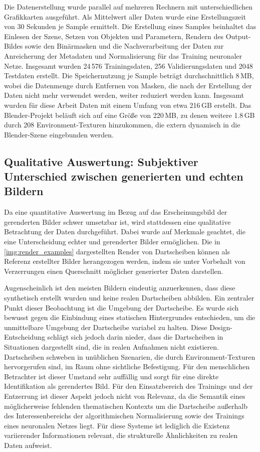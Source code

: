 Die Datenerstellung wurde parallel auf mehreren Rechnern mit unterschiedlichen Grafikkarten ausgeführt. Als Mittelwert aller Daten wurde eine Erstellungszeit von 30 Sekunden je Sample ermittelt. Die Erstellung eines Samples beinhaltet das Einlesen der Szene, Setzen von Objekten und Parametern, Rendern des Output-Bildes sowie den Binärmasken und die Nachverarbeitung der Daten zur Anreicherung der Metadaten und Normalisierung für das Training neuronaler Netze. Insgesamt wurden 24\,576 Trainingsdaten, 256 Validierungsdaten und 2048 Testdaten erstellt. Die Speichernutzung je Sample beträgt durchschnittlich 8\,MB, wobei die Datenmenge durch Entfernen von Masken, die nach der Erstellung der Daten nicht mehr verwendet werden, weiter reduziert werden kann. Insgesamt wurden für diese Arbeit Daten mit einem Umfang von etwa 216\,GB erstellt. Das Blender-Projekt beläuft sich auf eine Größe von 220\,MB, zu denen weitere 1.8\,GB durch 208 Environment-Texturen hinzukommen, die extern dynamisch in die Blender-Szene eingebunden werden.

\subsection{Qualitative Auswertung: Subjektiver Unterschied zwischen generierten und echten Bildern}  %
\label{sec:rendering_qualitativ}

Da eine quantitative Auswertung im Bezug auf das Erscheinungsbild der gerenderten Bilder schwer umsetzbar ist, wird stattdessen eine qualitative Betrachtung der Daten durchgeführt. Dabei wurde auf Merkmale geachtet, die eine Unterscheidung echter und gerenderter Bilder ermöglichen. Die in \autoref{img:render_examples} dargestellten Render von Dartscheiben können als Referenz erstellter Bilder herangezogen werden, indem sie unter Vorbehalt von Verzerrungen einen Querschnitt möglicher generierter Daten darstellen.

Augenscheinlich ist den meisten Bildern eindeutig anzuerkennen, dass diese synthetisch erstellt wurden und keine realen Dartscheiben abbilden. Ein zentraler Punkt dieser Beobachtung ist die Umgebung der Dartscheibe. Es wurde sich bewusst gegen die Einbindung eines statischen Hintergrundes entschieden, um die unmittelbare Umgebung der Dartscheibe variabel zu halten. Diese Design-Entscheidung schlägt sich jedoch darin nieder, dass die Dartscheiben in Situationen dargestellt sind, die in realen Aufnahmen nicht existieren. Dartscheiben schweben in unüblichen Szenarien, die durch Environment-Texturen hervorgerufen sind, im Raum ohne sichtliche Befestigung. Für den menschlichen Betrachter ist dieser Umstand sehr auffällig und sorgt für eine direkte Identifikation als gerendertes Bild. Für den Einsatzbereich des Trainings und der Entzerrung ist dieser Aspekt jedoch nicht von Relevanz, da die Semantik eines möglicherweise fehlenden thematischen Kontexts um die Dartscheibe außerhalb des Interessenbereichs der algorithmischen Normalisierung sowie des Trainings eines neuronalen Netzes liegt. Für diese Systeme ist lediglich die Existenz variierender Informationen relevant, die strukturelle Ähnlichkeiten zu realen Daten aufweist.

